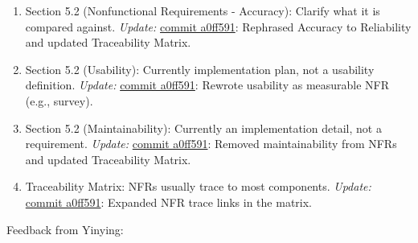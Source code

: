 \documentclass{article}
\begin{document}
\begin{enumerate}
    \item Section 5.2 (Nonfunctional Requirements - Accuracy): Clarify what it is compared against.  
    \newline \textit{Update:} \href{https://github.com/Yuanqi-X/Re-ProtGNN/commit/a0ff591}{commit a0ff591}: Rephrased Accuracy to Reliability and updated Traceability Matrix.

    \item Section 5.2 (Usability): Currently implementation plan, not a usability definition.  
    \newline \textit{Update:} \href{https://github.com/Yuanqi-X/Re-ProtGNN/commit/a0ff591}{commit a0ff591}: Rewrote usability as measurable NFR (e.g., survey).

    \item Section 5.2 (Maintainability): Currently an implementation detail, not a requirement.  
    \newline \textit{Update:} \href{https://github.com/Yuanqi-X/Re-ProtGNN/commit/a0ff591}{commit a0ff591}: Removed maintainability from NFRs and updated Traceability Matrix.

    \item Traceability Matrix: NFRs usually trace to most components.  
    \newline \textit{Update:} \href{https://github.com/Yuanqi-X/Re-ProtGNN/commit/a0ff591}{commit a0ff591}: Expanded NFR trace links in the matrix.
\end{enumerate}

Feedback from Yinying:
\end{document}
